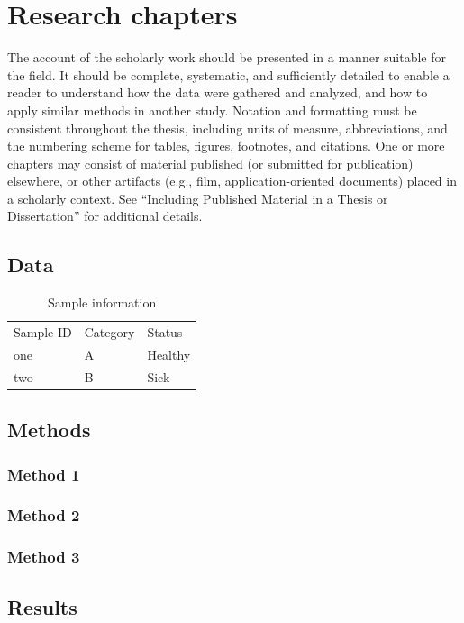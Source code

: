\section{Research chapters}

The account of the scholarly work should be presented in a manner suitable for the field. It should be complete, systematic, and sufficiently detailed to enable a reader to understand how the data were gathered and analyzed, and how to apply similar methods in another study. Notation and formatting must be consistent throughout the thesis, including units of measure, abbreviations, and the numbering scheme for tables, figures, footnotes, and citations. One or more chapters may consist of material published (or submitted for publication) elsewhere, or other artifacts (e.g., film, application-oriented documents) placed in a scholarly context. See “Including Published Material in a Thesis or Dissertation” for additional details.

\subsection{Data}

\begin{table}[H]
\caption{Sample information}
\label{table:sampleinfo}
\vspace{-.5em}
\begin{tabularx}{\textwidth}{@{}YYY@{}}
Sample ID & Category & Status \\
one & A & Healthy \\
two & B & Sick \\
\end{tabularx}
\end{table}

\subsection{Methods}
\subsubsection{Method 1}
\subsubsection{Method 2}
\subsubsection{Method 3}
\subsection{Results}
